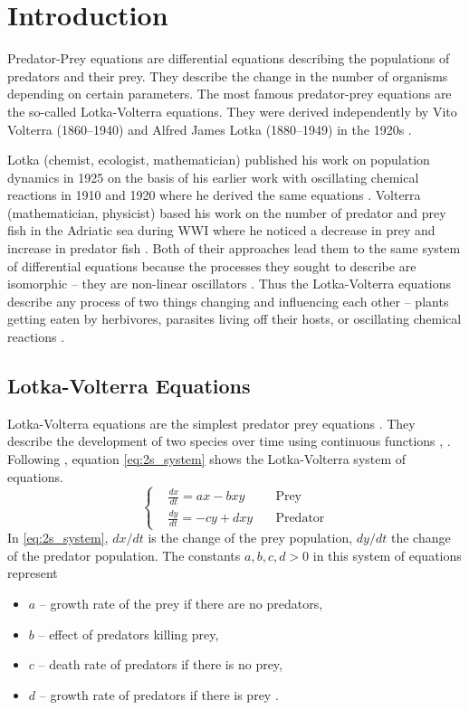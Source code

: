 \documentclass[12pt,a4paper,reqno]{amsart}
\begin{document}
\section{Introduction}

Predator-Prey equations are differential equations describing the populations
of predators and their prey. They describe the change in the number of
organisms depending on certain parameters. The most famous predator-prey
equations are the so-called Lotka-Volterra equations. They were derived
independently by Vito Volterra (1860--1940) and Alfred James Lotka (1880--1949)
in the 1920s \cite{hoppensteadt}.

Lotka (chemist, ecologist, mathematician) published his work on population
dynamics in 1925 on the basis of his earlier work with oscillating chemical
reactions in 1910 and 1920 where he derived the same equations \cite{israel}.
Volterra (mathematician, physicist) based his work on the number of predator
and prey fish in the Adriatic sea during WWI where he noticed a decrease in
prey and increase in predator fish \cite{hoppensteadt}. Both of their
approaches lead them to the same system of differential equations because the
processes they sought to describe are isomorphic -- they are non-linear
oscillators \cite{israel}. Thus the Lotka-Volterra equations describe any
process of two things changing and influencing each other -- plants getting
eaten by herbivores, parasites living off their hosts, or oscillating chemical
reactions \cite{hoppensteadt}.


\subsection{Lotka-Volterra Equations}
Lotka-Volterra equations are the simplest predator prey equations
\cite{hoppensteadt}. They describe the development of two species over time
using continuous functions \cite{chauvet}, \cite{hoppensteadt}. Following
\cite{chauvet}, equation \eqref{eq:2s_system} shows the Lotka-Volterra system
of equations.
\begin{equation}    
    \left\{\begin{aligned}
        &\frac{dx}{dt} = ax - bxy \quad &\text{Prey}\\
        &\frac{dy}{dt} = -cy +dxy \quad &\text{Predator}
    \end{aligned}\right.
    \label{eq:2s_system}
\end{equation}
In \eqref{eq:2s_system}, $dx/dt$ is the change of the prey population, $dy/dt$
the change of the predator population. The constants $a,b,c,d > 0$ in this 
system of equations represent
\begin{itemize}
    \item $a$ -- growth rate of the prey if there are no predators,
    \item $b$ -- effect of predators killing prey,
    \item $c$ -- death rate of predators if there is no prey,
    \item $d$ -- growth rate of predators if there is prey \cite{chauvet}.
\end{itemize}
\end{document}
